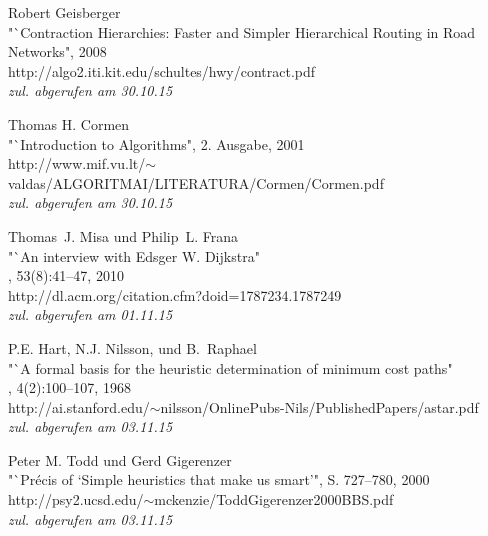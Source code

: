 \documentclass[12pt]{article}
\begin{document}
\begin{thebibliography}{99}
\clearpage

 Robert Geisberger\\
\newblock "`Contraction Hierarchies: Faster and Simpler Hierarchical Routing in Road Networks", 2008\\
\newblock http://algo2.iti.kit.edu/schultes/hwy/contract.pdf \\\emph{zul. abgerufen am 30.10.15}

 Thomas H. Cormen\\
\newblock "`Introduction to Algorithms", 2. Ausgabe, 2001\\
\newblock http://www.mif.vu.lt/$\sim$valdas/ALGORITMAI/LITERATURA/Cormen/Cormen.pdf \\\emph{zul. abgerufen am 30.10.15}

 Thomas~J. Misa und Philip~L. Frana\\
\newblock "`An interview with Edsger W. Dijkstra"\\
, 53(8):41--47, 2010\\
\newblock http://dl.acm.org/citation.cfm?doid=1787234.1787249 \\\emph{zul. abgerufen am 01.11.15}

 P.E. Hart, N.J. Nilsson, und B.~Raphael\\
\newblock "`A formal basis for the heuristic determination of minimum cost paths"\\
, 4(2):100--107, 1968\\
\newblock http://ai.stanford.edu/$\sim$nilsson/OnlinePubs-Nils/PublishedPapers/astar.pdf \\\emph{zul. abgerufen am 03.11.15}

 Peter M. Todd und Gerd Gigerenzer\\
\newblock "`Précis of `Simple heuristics that make us smart'", S. 727--780, 2000\\
\newblock http://psy2.ucsd.edu/$\sim$mckenzie/ToddGigerenzer2000BBS.pdf \\\emph{zul. abgerufen am 03.11.15}

\end{thebibliography}
\newpage

%

%


\end{document}
